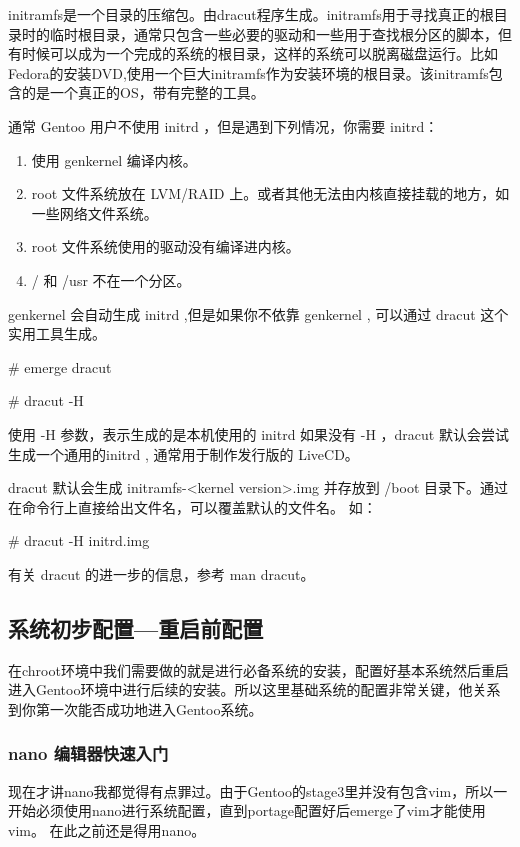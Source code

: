 initramfs是一个目录的压缩包。由dracut程序生成。initramfs用于寻找真正的根目录时的临时根目录，通常只包含一些必要的驱动和一些用于查找根分区的脚本，但有时候可以成为一个完成的系统的根目录，这样的系统可以脱离磁盘运行。比如Fedora的安装DVD,使用一个巨大initramfs作为安装环境的根目录。该initramfs包含的是一个真正的OS，带有完整的工具。


通常 Gentoo 用户不使用 initrd ，但是遇到下列情况，你需要 initrd：

\begin{enumerate}
\item 使用 genkernel 编译内核。
\item root 文件系统放在 LVM/RAID 上。或者其他无法由内核直接挂载的地方，如一些网络文件系统。
\item root 文件系统使用的驱动没有编译进内核。
\item / 和 /usr  不在一个分区。
\end{enumerate}

genkernel 会自动生成 initrd ,但是如果你不依靠 genkernel , 可以通过 dracut 这个实用工具生成。

\begin{code}
\# emerge dracut

\# dracut -H
\end{code}

使用 -H 参数，表示生成的是本机使用的 initrd 如果没有 -H ，dracut 默认会尝试生成一个通用的initrd , 通常用于制作发行版的 LiveCD。

dracut 默认会生成 initramfs-<kernel version>.img 并存放到 /boot 目录下。通过在命令行上直接给出文件名，可以覆盖默认的文件名。
如：

\begin{code}
\# dracut -H   initrd.img
\end{code}

有关 dracut 的进一步的信息，参考 man dracut。

\subsection{系统初步配置—重启前配置}
在chroot环境中我们需要做的就是进行必备系统的安装，配置好基本系统然后重启进入Gentoo环境中进行后续的安装。所以这里基础系统的配置非常关键，他关系到你第一次能否成功地进入Gentoo系统。

\subsubsection{nano 编辑器快速入门}\label{sec:nano}
现在才讲nano我都觉得有点罪过。由于Gentoo的stage3里并没有包含vim，所以一开始必须使用nano进行系统配置，直到portage配置好后emerge了vim才能使用vim。
在此之前还是得用nano。

